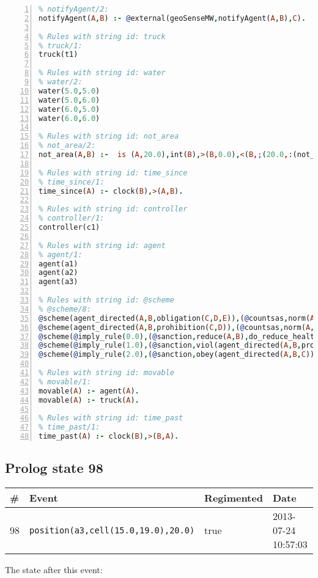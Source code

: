 \documentclass[11pt]{article}\usepackage[utf8]{inputenc}\usepackage{geometry}
\begin{document}
\begin{lstlisting}[language=Prolog, numbers=left]
% Rules with string id: notifyAgent
% notifyAgent/2:
notifyAgent(A,B) :- @external(geoSenseMW,notifyAgent(A,B),C).

% Rules with string id: truck
% truck/1:
truck(t1)

% Rules with string id: water
% water/2:
water(5.0,5.0)
water(5.0,6.0)
water(6.0,5.0)
water(6.0,6.0)

% Rules with string id: not_area
% not_area/2:
not_area(A,B) :-  is (A,20.0),int(B),>(B,0.0),<(B,;(20.0,:(not_area(A,B), is (-(B),20.0)))),int(A),>(A,0.0),<(A,;(20.0,:(area(A,B),-(int(A))))),int(B),>(A,0.0),>(B,0.0),<(A,21.0),<(B,21.0).

% Rules with string id: time_since
% time_since/1:
time_since(A) :- clock(B),>(A,B).

% Rules with string id: controller
% controller/1:
controller(c1)

% Rules with string id: agent
% agent/1:
agent(a1)
agent(a2)
agent(a3)

% Rules with string id: @scheme
% @scheme/8:
@scheme(agent_directed(A,B,obligation(C,D,E)),(@countsas,norm(A,B,F,obligation(C,D,E)),F),false,(listTrue(C)),(time_past(D)),false,[plus(viol(agent_directed(A,B,obligation(C,D,E))))|[]],[plus(obey(agent_directed(A,B,obligation(C,D,E))))|[]])
@scheme(agent_directed(A,B,prohibition(C,D)),(@countsas,norm(A,B,E,prohibition(C,D)),E),(listTrue(C)),false,(false),false,[plus(viol(agent_directed(A,B,prohibition(C,D))))|[]],[plus(obey(agent_directed(A,B,prohibition(C,D))))|[]])
@scheme(@imply_rule(0.0),(@sanction,reduce(A,B),do_reduce_health(A,B),notifyAgent(A,changed(status))),true,false,false,false,[min(reduce(A,B))|[]],[])
@scheme(@imply_rule(1.0),(@sanction,viol(agent_directed(A,B,prohibition(C,D))),do_sanction(D)),true,false,false,false,[min(viol(agent_directed(A,B,prohibition(C,D))))|[]],[])
@scheme(@imply_rule(2.0),(@sanction,obey(agent_directed(A,B,C))),true,false,false,false,[min(obey(agent_directed(A,B,C)))|[]],[])

% Rules with string id: movable
% movable/1:
movable(A) :- agent(A).
movable(A) :- truck(A).

% Rules with string id: time_past
% time_past/1:
time_past(A) :- clock(B),>(B,A).

\end{lstlisting}
\clearpage 
\subsection{Prolog state 98}
\begin{table}[ht]
\centering 
\begin{tabular}{l l l l} 
\textbf{\#} & \textbf{Event} & \textbf{Regimented} & \textbf{Date} \\ [0.5ex] 
\hline
98&\texttt{position(a3,cell(15.0,19.0),20.0)}&true&2013-07-24 10:57:03\\ [1ex] \hline\end{tabular}
\end{table}
The state after this event:
\end{document}
